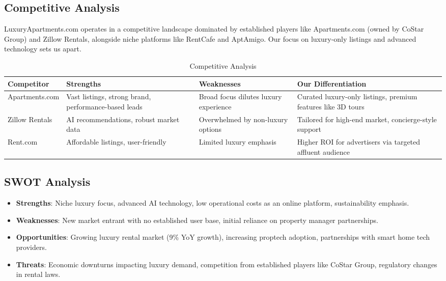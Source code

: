 \documentclass[12pt]{article}
\begin{document}
\subsection{Competitive Analysis}
LuxuryApartments.com operates in a competitive landscape dominated by established players like Apartments.com (owned by CoStar Group) and Zillow Rentals, alongside niche platforms like RentCafe and AptAmigo. Our focus on luxury-only listings and advanced technology sets us apart.

\begin{table}[h]
\centering
\caption{Competitive Analysis}
\begin{tabular}{C{3cm} C{4cm} C{4cm} C{4cm}}
\toprule
\textbf{Competitor} & \textbf{Strengths} & \textbf{Weaknesses} & \textbf{Our Differentiation} \\
\midrule
Apartments.com & Vast listings, strong brand, performance-based leads & Broad focus dilutes luxury experience & Curated luxury-only listings, premium features like 3D tours \\
Zillow Rentals & AI recommendations, robust market data & Overwhelmed by non-luxury options & Tailored for high-end market, concierge-style support \\
Rent.com & Affordable listings, user-friendly & Limited luxury emphasis & Higher ROI for advertisers via targeted affluent audience \\
\bottomrule
\end{tabular}
\end{table}

\subsection{SWOT Analysis}
\begin{itemize}
    \item \textbf{Strengths}: Niche luxury focus, advanced AI technology, low operational costs as an online platform, sustainability emphasis.
    \item \textbf{Weaknesses}: New market entrant with no established user base, initial reliance on property manager partnerships.
    \item \textbf{Opportunities}: Growing luxury rental market (9\% YoY growth), increasing proptech adoption, partnerships with smart home tech providers.
    \item \textbf{Threats}: Economic downturns impacting luxury demand, competition from established players like CoStar Group, regulatory changes in rental laws.
\end{itemize}
\end{document}
